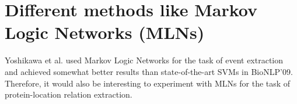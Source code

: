 \section{Different methods like Markov Logic Networks (MLNs)}


Yoshikawa et al. used Markov Logic Networks \cite{yoshikawa2011coreference} for the task of event extraction and achieved somewhat better results than state-of-the-art SVMs in BioNLP'09. Therefore, it would also be interesting to experiment with MLNs for the task of protein-location relation extraction.